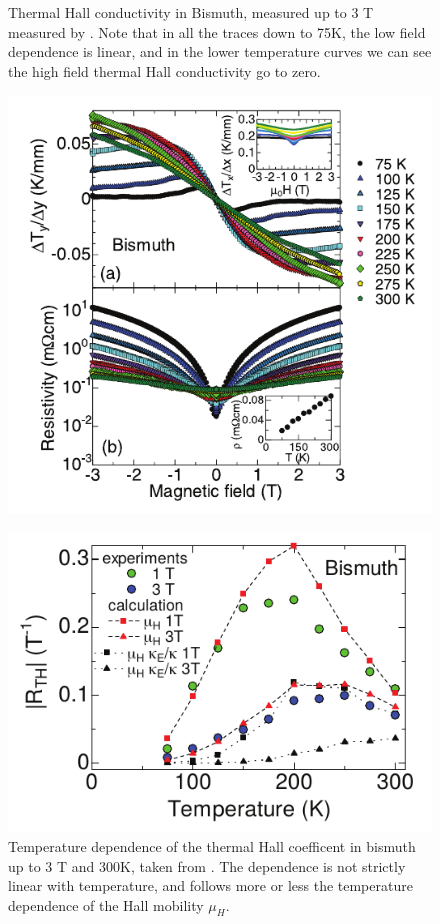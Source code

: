 \documentclass{thesis-umich}
\begin{document}
\begin{figure}
	\centering
	\begin{minipage}{.45\linewidth}
	\caption[Thermal Hall conductivity in Bismuth up to 3 T]{Thermal Hall conductivity in Bismuth, measured up to 3 T measured by \cite{Kobayashi2012}. Note that in all the traces down to 75K, the low field dependence is linear, and in the lower temperature curves we can see the high field thermal Hall conductivity go to zero.}
	\label{fig:kobayashi1}
	\includegraphics[width=\linewidth]{figures/kobayashi12_fig1.pdf}
	\end{minipage}
	\hspace{.05\linewidth}
	\begin{minipage}{.45\linewidth}
		\caption[Temperature dependence of $R_{TH}$ in bismuth up to 3 T]{Temperature dependence of the thermal Hall coefficent in bismuth up to 3 T and 300K, taken from \cite{Kobayashi2012}. The dependence is not strictly linear with temperature, and follows more or less the temperature dependence of the Hall mobility $\mu_H$.}
	\label{fig:kobayashi2}
	\includegraphics[width=\linewidth]{figures/kobayashi12_fig2.pdf}
	\end{minipage}
\end{figure}
\end{document}
